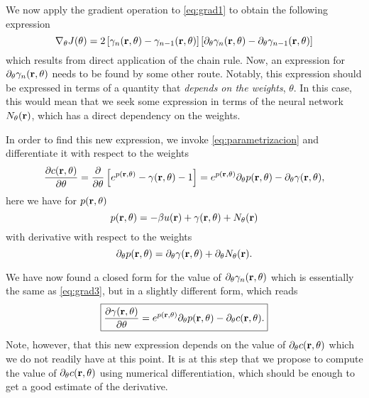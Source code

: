 We now apply the gradient operation to \autoref{eq:grad1} to obtain the following
expression
\begin{equation}
    \nabla_{\theta} J(\theta) = 2 \left[\gamma_{n}(\mathbf{r}, \theta) - \gamma_{n-1}(\mathbf{r}, \theta) \right]
    \left[ \partial_{\theta} \gamma_{n}(\mathbf{r}, \theta) - \partial_{\theta} \gamma_{n-1}(\mathbf{r}, \theta) \right]
    \label{eq:grad2}
\end{equation}
which results from direct application of the chain rule. Now, an expression for
$\partial_{\theta} \gamma_{n}(\mathbf{r}, \theta)$ needs to
be found by some other route. Notably, this expression should be expressed in terms
of a quantity that \emph{depends on the weights}, $\theta$. In this case, 
this would mean that we seek some expression in terms of the neural
network $N_{\theta}(\mathbf{r})$, which has a direct dependency on the weights.

In order to find this new expression, we invoke \autoref{eq:parametrizacion} and
differentiate it with respect to the weights
\begin{equation}
    \frac{\partial c(\mathbf{r}, \theta)}{\partial \theta} = \frac{\partial}{\partial \theta}
    \left[ e^{p(\mathbf{r}, \theta)} - \gamma(\mathbf{r}, \theta) - 1 \right] =
    e^{p(\mathbf{r}, \theta)} \partial_{\theta} p(\mathbf{r}, \theta) - \partial_{\theta} \gamma(\mathbf{r}, \theta)
    ,
    \label{eq:grad3}
\end{equation}
here we have for $p(\mathbf{r}, \theta)$
\begin{equation}
    p(\mathbf{r}, \theta) = -\beta u(\mathbf{r}) + \gamma(\mathbf{r}, \theta) + N_{\theta}(\mathbf{r})
    \label{eq:pr}    
\end{equation}
with derivative with respect to the weights
\begin{equation}
    \partial_{\theta} p(\mathbf{r}, \theta) = \partial_{\theta} \gamma(\mathbf{r}, \theta) + \partial_{\theta} N_{\theta}(\mathbf{r})
    .
    \label{eq:grad-pr}
\end{equation}

We have now found a closed form for the value of
$\partial_{\theta} \gamma_{n}(\mathbf{r}, \theta)$
which is essentially the same as \autoref{eq:grad3}, but in a slightly different form,
which reads
\begin{equation}
    \boxed{
    \frac{\partial \gamma(\mathbf{r}, \theta)}{\partial \theta} =
    e^{p(\mathbf{r}, \theta)} \partial_{\theta} p(\mathbf{r}, \theta) - \partial_{\theta} c(\mathbf{r}, \theta)
    .
    }
    \label{eq:grad4}
\end{equation}
Note, however, that this new expression depends on the value of
$\partial_{\theta} c(\mathbf{r}, \theta)$
which we do not readily have at this point. It is at this step that we propose
to compute the value of $\partial_{\theta} c(\mathbf{r}, \theta)$ using numerical
differentiation, which should be enough to get a good estimate of the derivative.

